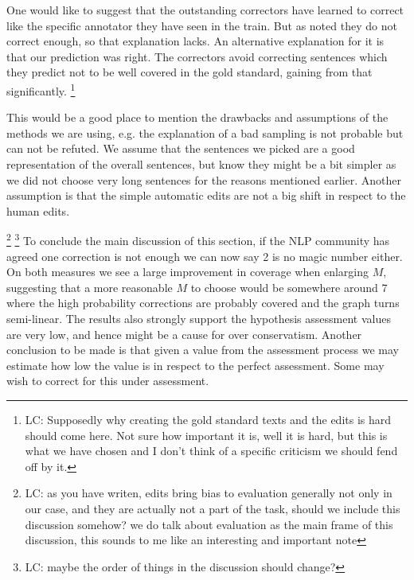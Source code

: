 \documentclass[letter,11pt]{article}
\newcommand{\com}[1]{}
\newcommand{\oa}[1]{\footnote{\color{red}OA: #1}}
\newcommand{\lc}[1]{\footnote{\color{green}LC: #1}}
\begin{document}
		One would like to suggest that the outstanding correctors have learned to correct like the specific annotator they have seen in the train. But as noted they do not correct enough, so that explanation lacks. An alternative explanation for it is that our prediction was right. The correctors avoid correcting sentences which they predict not to be well covered in the gold standard, gaining from that significantly.
		\lc{Supposedly why creating the gold standard texts and the edits is hard should come here. Not sure how important it is, well it is hard, but this is what we have chosen and I don't think of a specific criticism we should fend off by it.}
		
		This would be a good place to mention the drawbacks and assumptions of the methods we are using, e.g. the explanation of a bad sampling is not probable but can not be refuted. We assume that the sentences we picked are a good representation of the overall sentences, but know they might be a bit simpler as we did not choose very long sentences for the reasons mentioned earlier. Another assumption is that the simple automatic edits are not a big shift in respect to the human edits.
		
		\com{This may result by the mechanical creation of edits. The different edits might give bias to the results\oa{but this is also true when evaluating real systems, no?}. Edit borders are not part of what correctors need to extract, in other words, it is an information that is not inherent to the task. Those edits are a disadvantage of the scoring system itself. It makes crowdsourcing much harder, and the edits are yet another thing that annotations often disagree upon(\cite{dahlmeier2012better}). It might be another reason that calls for use of another, more interpretable score.}
		\lc{as you have writen, edits bring bias to evaluation generally not only in our case, and they are actually not a part of the task, should we include this discussion somehow? we do talk about evaluation as the main frame of this discussion, this sounds to me like an interesting and important note}
		\lc{maybe the order of things in the discussion should change?}
		To conclude the main discussion of this section, if the NLP community has agreed one correction is not enough\cite{tetreault2008native}
		we can now say 2 is no magic number either. On both measures we see a large improvement in coverage when enlarging $M$, suggesting that a more reasonable $M$ to choose would be somewhere around 7 where the high probability corrections are probably covered and the graph turns semi-linear. The results also strongly support the hypothesis assessment values are very low, and hence might be a cause for over conservatism.
		Another conclusion to be made is that given a value from the assessment process we may estimate how low the value is in respect to the perfect assessment. Some may wish to correct for this under assessment.
		
\end{document}
